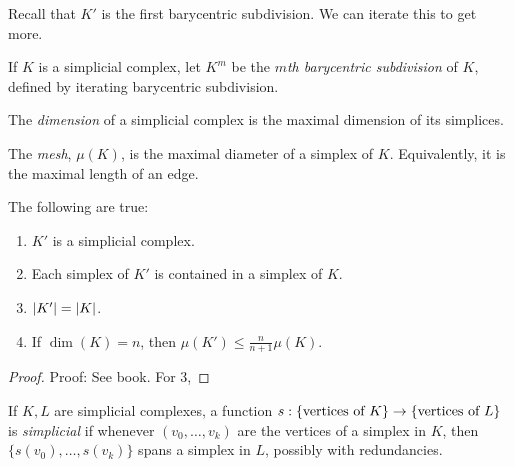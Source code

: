 
Recall that $K'$ is the first barycentric subdivision. We can iterate this to get more.

\begin{definition}
    If $K$ is a simplicial complex, let $K^{m}$ be the \emph{$m$th barycentric subdivision} of $K$, defined by iterating barycentric subdivision.
\end{definition}

\begin{definition}
    The \emph{dimension} of a simplicial complex is the maximal dimension of its simplices.
\end{definition}

\begin{definition}
    The \emph{mesh}, $\mu(K)$, is the maximal diameter of a simplex of $K$. Equivalently, it is the maximal length of an edge.
\end{definition}

\begin{lemma}
    The following are true:
    \begin{enumerate}[start = 0]
        \item $K'$ is a simplicial complex.
        \item Each simplex of $K'$ is contained in a simplex of $K$.
        \item $\abs{K'} = \abs{K}$.
        \item If $\dim(K) = n$, then $\mu(K') \leq \frac{n}{n + 1}\mu(K)$.
    \end{enumerate}
\end{lemma}
\begin{proof}{Proof:}
    See book. For 3,
\end{proof}

\begin{definition}
    If $K, L$ are simplicial complexes, a function $s : \{\tt{vertices of } K\} \to \{\tt{vertices of } L\}$ is \emph{simplicial} if whenever $(v_0, \ldots, v_k)$ are the vertices of a simplex in $K$, then $\{s(v_0), \ldots, s(v_k)\}$ spans a simplex in $L$, possibly with redundancies.
\end{definition}


